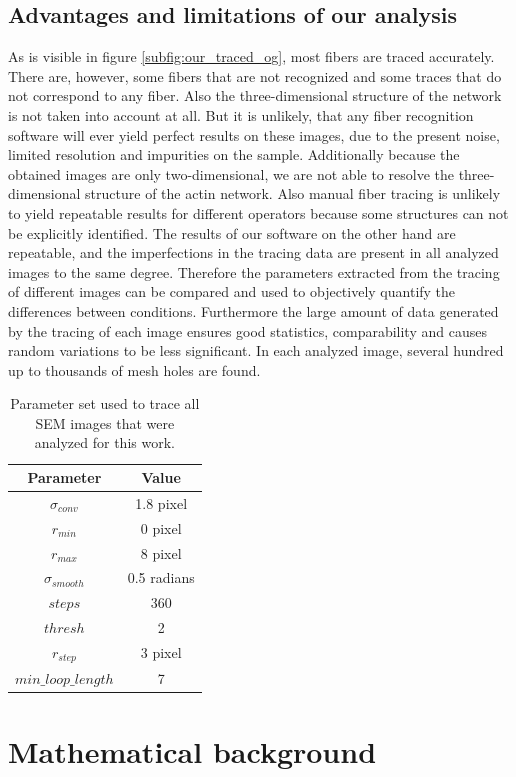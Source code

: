 \documentclass[12pt,english,twocolumn]{revtex4}
\begin{document}
\subsection{Advantages and limitations of our analysis}
As is visible in figure \ref{subfig:our_traced_og}, most fibers are traced accurately. There are, however, some fibers that are not recognized and some traces that do not correspond to any fiber. Also the three-dimensional structure of the network is not taken into account at all. But it is unlikely, that any fiber recognition software will ever yield perfect results on these images, due to the present noise, limited resolution and impurities on the sample. Additionally because the obtained images are only two-dimensional, we are not able to resolve the three-dimensional structure of the actin network. Also manual fiber tracing is unlikely to yield repeatable results for different operators because some structures can not be explicitly identified. The results of our software on the other hand are repeatable, and the imperfections in the tracing data are present in all analyzed images to the same degree. Therefore the parameters extracted from the tracing of different images can be compared and used to objectively quantify the differences between conditions. Furthermore the large amount of data generated by the tracing of each image ensures good statistics, comparability and causes random variations to be less significant. In each analyzed image, several hundred up to thousands of mesh holes are found.
\begin{table}[h!] \label{tab:parameters}
\centering
\caption{Parameter set used to trace all SEM images that were analyzed for this work.}
\label{tab:parameters}
\begin{tabular}{c|c}
	Parameter & Value\\
	\hline
	$\sigma_{conv}$ & 1.8 pixel\\
	$r_{min}$ & 0 pixel\\
	$r_{max}$ & 8 pixel\\
	$\sigma_{smooth}$ & 0.5 radians\\
	$steps$ & 360\\
	$thresh$ & 2\\
	$r_{step}$ & 3 pixel\\
	$min\_loop\_length$ & 7\\
\end{tabular}
\end{table}

\section{Mathematical background}
\end{document}
